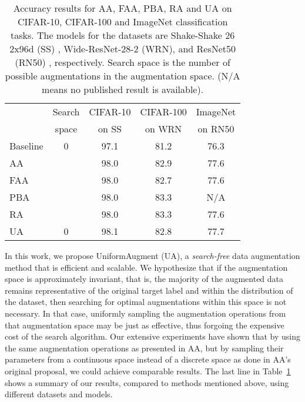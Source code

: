 \documentclass[runningheads]{llncs}
\begin{document}
	
	\setlength{\tabcolsep}{4pt}
	\begin{table} [htb]
		\begin{center}
			\caption{Accuracy results for AA, FAA, PBA, RA and UA on CIFAR-10, CIFAR-100 \cite{krizhevsky2009learning} and ImageNet classification tasks. The models for the datasets are Shake-Shake 26 2x96d (SS) \cite{shake-shake}, Wide-ResNet-28-2 (WRN), and ResNet50 (RN50) \cite{resnet50}, respectively. Search space is the number of possible augmentations in the augmentation space. (N/A means no published result is available).}
			
			\label{table:summary}
			\begin{tabular}{l|c|c|c|c}
				\hline & Search & CIFAR-10 & CIFAR-100 & ImageNet\\
				& space & on SS & on WRN & on RN50\\
\hline \hline Baseline & 0    & 97.1 & 81.2  & 76.3\\
				\hline
AA  &  & 98.0 & 82.9  & 77.6 \\
				FAA &  & 98.0 & 82.7  & 77.6 \\
				PBA &  & 98.0 & 83.3  & N/A    \\
				RA  &   & 98.0 & 83.3  & 77.6 \\
				UA & 0     & 98.1 & 82.8  & 77.7 \\
				\hline
			\end{tabular}
		\end{center}
	\end{table}
	
	In this work, we propose UniformAugment (UA), a \emph{search-free} data augmentation method that is efficient and scalable. We hypothesize that if the augmentation space is approximately invariant, that is, the majority of the augmented data remains representative of the original target label and within the distribution of the dataset, then searching for optimal augmentations within this space is not necessary.  In that case, uniformly sampling the augmentation operations from that augmentation space may be just as effective, thus forgoing the expensive cost of the search algorithm. Our extensive experiments have shown that by using the same augmentation operations as presented in AA, but by sampling their parameters from a continuous space instead of a discrete space as done in AA's original proposal, we could achieve comparable results. 
	The last line in Table~\ref{table:summary} shows a summary of our results, compared to  methods mentioned above, using different datasets and models. 
	
\end{document}
